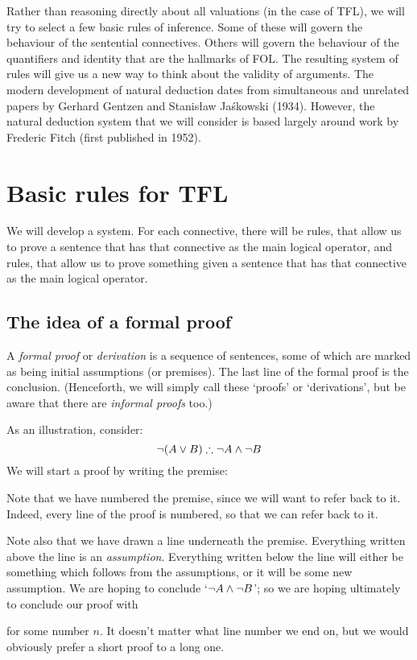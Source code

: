 Rather than reasoning directly about all valuations (in the case of TFL), we will try to select a few basic rules of inference. Some of these will govern the behaviour of the sentential connectives. Others will govern the behaviour of the quantifiers and identity that are the hallmarks of FOL. The resulting system of rules will give us a new way to think about the validity of arguments.
The modern development of natural deduction dates from simultaneous and unrelated papers by Gerhard Gentzen and Stanis\l{}aw Ja\'{s}kowski (1934). However, the natural deduction system that we will consider is based largely around work by Frederic Fitch (first published in 1952).



\chapter{Basic rules for TFL}\label{s:BasicTFL}
We will develop a  system. For each connective, there will be  rules, that allow us to prove a sentence that has that connective as the main logical operator, and  rules, that allow us to prove something given a sentence that has that connective as the main logical operator.

\section{The idea of a formal proof}
A \emph{formal proof} or \emph{derivation} is a sequence of sentences,
some of which are marked as being initial assumptions (or premises).
The last line of the formal proof is the conclusion. (Henceforth, we
will simply call these `proofs' or `derivations', but be aware that
there are \emph{informal proofs} too.)

As an illustration, consider:
	$$\enot (A \eor B) \therefore \enot A \eand \enot B$$
We will start a proof by writing the premise:
\begin{fitchproof}
\end{fitchproof}
Note that we have numbered the premise, since we will want to refer back to it. Indeed, every line of the proof is numbered, so that we can refer back to it.

Note also that we have drawn a line underneath the premise. Everything written above the line is an \emph{assumption}. Everything written below the line will either be something which follows from the assumptions, or it will be some new assumption. We are hoping to conclude `$\neg A \wedge \neg B$'; so we are hoping ultimately to conclude our proof with
\begin{fitchproof}
\end{fitchproof}
for some number $n$. It doesn't matter what line number we end on, but we would obviously prefer a short proof to a long one.

